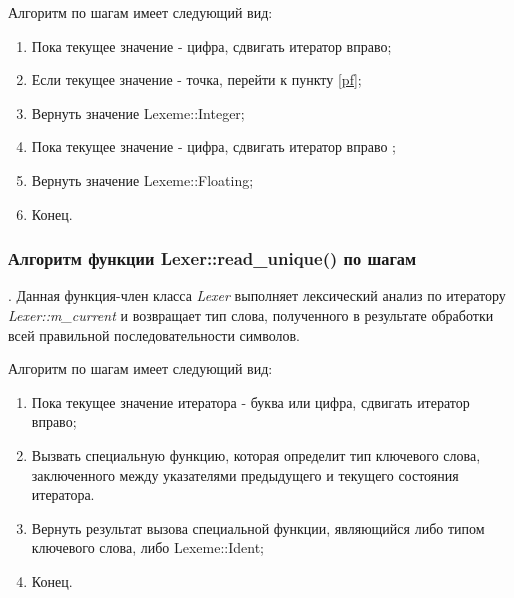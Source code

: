 Алгоритм по шагам имеет следующий вид:
\begin{enumerate}
    \item Пока текущее значение - цифра, сдвигать итератор вправо;
    \item Если текущее значение - точка, перейти к пункту \ref{pf};
    \item Вернуть значение Lexeme::Integer;
    \item Пока текущее значение - цифра, сдвигать итератор вправо \label{pf};
    \item Вернуть значение Lexeme::Floating;
    \item Конец.
\end{enumerate}

\subsubsection{Алгоритм функции Lexer::read\_unique() по шагам}.
Данная функция-член класса \emph{Lexer} выполняет лексический анализ
по итератору \emph{Lexer::m\_current} и возвращает тип слова,
полученного в результате обработки 
всей правильной последовательности символов.

Алгоритм по шагам имеет следующий вид:
\begin{enumerate}
    \item Пока текущее значение итератора - буква или цифра, 
          сдвигать итератор вправо;

    \item Вызвать специальную функцию,
          которая определит тип ключевого слова,
          заключенного между указателями 
          предыдущего и текущего состояния итератора.

    \item Вернуть результат вызова специальной функции,
          являющийся либо типом ключевого слова, 
          либо Lexeme::Ident;

    \item Конец.
\end{enumerate}
